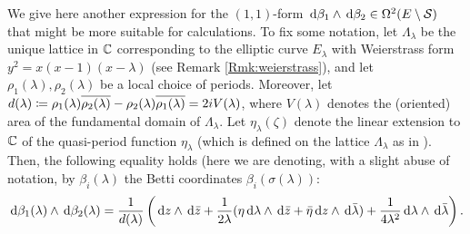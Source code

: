 \documentclass[a4paper,12pt]{article}
\theoremstyle{remark}
\begin{document}
We give here another expression for the $(1,1)$-form $\,\mathrm d \beta_1 \wedge \,\mathrm d \beta_2 \in \Omega^2(E \setminus \mathcal{S})$ that might be more suitable for calculations. To fix some notation, let $\Lambda_{\lambda}$ be the unique lattice in $\mathbb C$ corresponding to the elliptic curve $E_{\lambda}$ with Weierstrass form $y^2=x(x-1)(x-\lambda)$ (see Remark \ref{Rmk:weierstrass}), and let $\rho_1(\lambda),\rho_2(\lambda)$ be a local choice of periods. Moreover, let $d(\lambda)\coloneqq\rho_1(\lambda)\overline{\rho_2(\lambda)}-\rho_2(\lambda)\overline{\rho_1(\lambda)}=2iV(\lambda)$, where $V(\lambda)$ denotes the (oriented) area of the fundamental domain of $\Lambda_{\lambda}$. Let $\eta_{\lambda}(\zeta)$ denote the linear extension to $\mathbb C$ of the quasi-period function $\eta_{\lambda}$ (which is defined on the lattice $\Lambda_{\lambda}$ as in \cite[VI.3.1]{silverman1994advanced}). Then, the following equality holds (here we are denoting, with a slight abuse of notation, by $\beta_i(\lambda)$ the Betti coordinates $\beta_i(\sigma(\lambda))$:
\begin{equation}\label{riscrittura}
	\,\mathrm d \beta_1(\lambda) \wedge \,\mathrm d \beta_2(\lambda)=\frac{1}{d(\lambda)}\left(\,\mathrm d z \wedge \,\mathrm d \bar{z}+\frac{1}{2\lambda}(\eta \,\mathrm d \lambda \wedge \,\mathrm d \bar{z}+\bar{\eta}\,\mathrm d{z}\wedge\,\mathrm d{\bar{\lambda}})+\frac{1}{4\lambda^2}\,\mathrm d \lambda \wedge \,\mathrm d \bar{\lambda}\right).
\end{equation}
\end{document}
